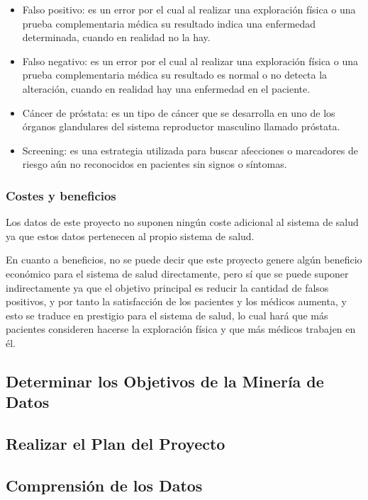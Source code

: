 \documentclass{article}
\begin{document}
\begin{itemize}
	\item Falso positivo: es un error por el cual al realizar una exploración física o una prueba complementaria médica su resultado indica una enfermedad determinada, cuando en realidad no la hay.
	\item Falso negativo: es un error por el cual al realizar una exploración física o una prueba complementaria médica su resultado es normal o no detecta la alteración, cuando en realidad hay una enfermedad en el paciente.
	\item Cáncer de próstata: es un tipo de cáncer que se desarrolla en uno de los órganos glandulares del sistema reproductor masculino llamado próstata.
	\item Screening: es una estrategia utilizada para buscar afecciones o marcadores de riesgo aún no reconocidos en pacientes sin signos o síntomas.
\end{itemize}

\subsubsection{Costes y beneficios}
Los datos de este proyecto no suponen ningún coste adicional al sistema de salud ya que estos datos pertenecen al propio sistema de salud.

En cuanto a beneficios, no se puede decir que este proyecto genere algún beneficio económico para el sistema de salud directamente, pero sí que se puede suponer indirectamente ya que el objetivo principal es reducir la cantidad de falsos positivos, y por tanto la satisfacción de los pacientes y los médicos aumenta, y esto se traduce en prestigio para el sistema de salud, lo cual hará que más pacientes consideren hacerse la exploración física y que más médicos trabajen en él.

\subsection{Determinar los Objetivos de la Minería de Datos}
\subsection{Realizar el Plan del Proyecto}
\subsection{Comprensión de los Datos}
\end{document}
